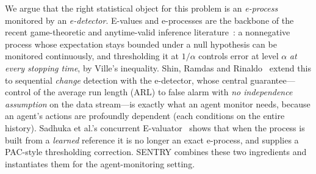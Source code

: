 \documentclass[pdflatex,sn-mathphys-num]{sn-jnl}%
\theoremstyle{thmstyleone}%
\theoremstyle{thmstyletwo}%
\theoremstyle{thmstylethree}%
\begin{document}
We argue that the right statistical object for this problem is an
\emph{e-process} monitored by an \emph{e-detector}. E-values and e-processes
are the backbone of the recent game-theoretic and anytime-valid inference
literature~\cite{ramdas2023gametheoretic,vovk2021evalues,grunwald2024safetesting}:
a nonnegative process whose expectation stays bounded under a null hypothesis
can be monitored continuously, and thresholding it at \(1/\alpha\) controls
error at level \(\alpha\) \emph{at every stopping time}, by Ville's
inequality. Shin, Ramdas and Rinaldo~\cite{shin2023edetectors} extend this to
sequential \emph{change} detection with the e-detector, whose central
guarantee---control of the average run length (ARL) to false alarm with
\emph{no independence assumption} on the data stream---is exactly what an agent
monitor needs, because an agent's actions are profoundly dependent (each
conditions on the entire history). Sadhuka et al.'s concurrent
E-valuator~\cite{sadhuka2025evaluator} shows that when the process is built
from a \emph{learned} reference it is no longer an exact e-process, and
supplies a PAC-style thresholding correction. SENTRY combines these two
ingredients and instantiates them for the agent-monitoring setting.
\end{document}

